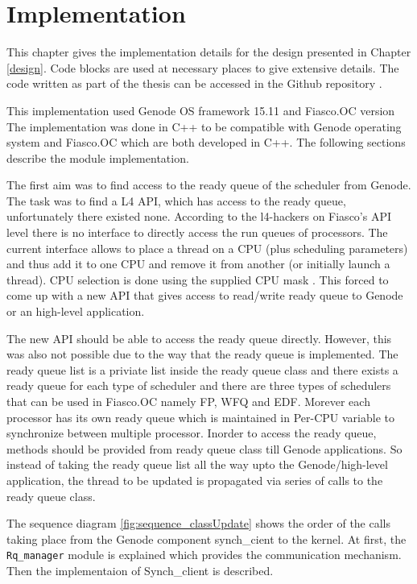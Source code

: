 \chapter{Implementation}

This chapter gives the implementation details for the design presented in Chapter \ref{design}. Code blocks are used at necessary places to give extensive details. The code written as part of the thesis can be accessed in the Github repository \cite{git_synccode}.

This implementation used Genode OS framework 15.11 and Fiasco.OC version %
The implementation was done in C++ to be compatible with Genode operating system and Fiasco.OC which are both developed in C++. The following sections describe the module implementation.

The first aim was to find access to the ready queue of the scheduler from Genode. The task was to find a L4 API, which has access to the ready queue, unfortunately there existed none. According to the l4-hackers on Fiasco's API level there is no interface to directly access the run queues of processors. The current interface allows to place a thread on a CPU (plus scheduling parameters) and thus add it to one CPU and remove it from another (or initially launch a thread). CPU selection is done using the supplied CPU mask \cite{l4hack}. This forced to come up with a new API that gives access to read/write ready queue to Genode or an high-level application.

The new API should be able to access the ready queue directly. However, this was also not possible due to the way that the ready queue is implemented. The ready queue list is a priviate list inside the ready queue class and there exists a ready queue for each type of scheduler and there are three types of schedulers that can be used in Fiasco.OC namely FP, WFQ and EDF. Morever each processor has its own ready queue which is maintained in Per-CPU variable to synchronize between multiple processor. Inorder to access the ready queue, methods should be provided from ready queue class till Genode applications. So instead of taking the ready queue list all the way upto the Genode/high-level application, the thread to be updated is propagated via series of calls to the ready queue class.

The sequence diagram \ref{fig:sequence_classUpdate} shows the order of the calls taking place from the Genode component synch\_cient to the kernel. At first, the \texttt{Rq\_manager} module is explained which provides the communication mechanism. Then the implementaion of Synch\_client is described.


